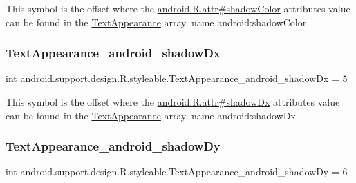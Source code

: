 This symbol is the offset where the \hyperlink{}{android.\+R.\+attr\#shadow\+Color} attribute\textquotesingle{}s value can be found in the \hyperlink{classandroid_1_1support_1_1design_1_1R_1_1styleable_a23dc46ec989f92f528b46568dad7e726}{Text\+Appearance} array.  name android\+:shadow\+Color \mbox{\label{classandroid_1_1support_1_1design_1_1R_1_1styleable_a30a8e4e2699c781ee99129168187e77f}} 
\subsubsection{\texorpdfstring{Text\+Appearance\+\_\+android\+\_\+shadow\+Dx}{TextAppearance\_android\_shadowDx}}
{\footnotesize\ttfamily int android.\+support.\+design.\+R.\+styleable.\+Text\+Appearance\+\_\+android\+\_\+shadow\+Dx = 5\hspace{0.3cm}{\ttfamily [static]}}

This symbol is the offset where the \hyperlink{}{android.\+R.\+attr\#shadow\+Dx} attribute\textquotesingle{}s value can be found in the \hyperlink{classandroid_1_1support_1_1design_1_1R_1_1styleable_a23dc46ec989f92f528b46568dad7e726}{Text\+Appearance} array.  name android\+:shadow\+Dx \mbox{\label{classandroid_1_1support_1_1design_1_1R_1_1styleable_aa0966b9f92f1a6c95b273b28b68eb9b4}} 
\subsubsection{\texorpdfstring{Text\+Appearance\+\_\+android\+\_\+shadow\+Dy}{TextAppearance\_android\_shadowDy}}
{\footnotesize\ttfamily int android.\+support.\+design.\+R.\+styleable.\+Text\+Appearance\+\_\+android\+\_\+shadow\+Dy = 6\hspace{0.3cm}{\ttfamily [static]}}


